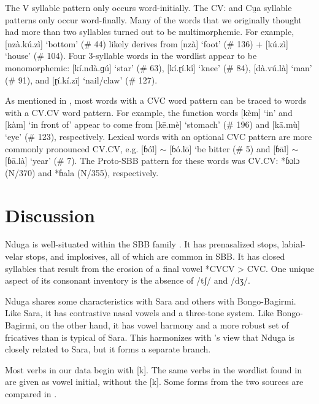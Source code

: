 \documentclass[output=paper,colorlinks,citecolor=brown
]{langscibook}
\begin{document}
The V syllable pattern only occurs word-initially. The CVː and Cu̯a syllable patterns only occur word-finally. Many of the words that we originally thought had more than two syllables turned out to be multimorphemic. For example, [nzà.kú.zì] ‘bottom’ (\# 44) likely derives from [nzà] ‘foot’ (\# 136) + [kú.zì] ‘house’ (\# 104). Four 3-syllable words in the wordlist appear to be monomorphemic: [kí.ndà.ɡú] ‘star’ (\# 63), [kí.ɽí.kî] ‘knee’ (\# 84), [dà.vú.là] ‘man’ (\# 91), and [ɽí.kí.zī] ‘nail/claw’ (\# 127).

As mentioned in , most  words with a CVC word pattern can be traced to words with a CV.CV word pattern. For example, the function words [kèm] ‘in’ and [kàm] ‘in front of’ appear to come from [kē.mè] ‘stomach’ (\# 196) and [kā.mù] ‘eye’ (\# 123), respectively. Lexical words with an optional CVC pattern are more commonly pronounced CV.CV, e.g. [ɓól̄] \(\sim \) [ɓó.lō] ‘be bitter (\# 5) and [ɓāl] \(\sim \) [ɓā.là] ‘year’ (\# 7). The Proto-SBB pattern for these words was CV.CV: *ɓɔlɔ (N/370) and *ɓala (N/355), respectively.

\section{Discussion}
\label{sec:olson:discussion}

Nduga is well-situated within the SBB family \citetext{\citealp{boyeldieu2006}; \citealp{dimmendaal2019}}. It has prenasalized stops, labial-velar stops, and implosives, all of which are common in SBB. It has closed syllables that result from the erosion of a final vowel *CVCV > CVC. One unique aspect of its consonant inventory is the absence of /tʃ/ and /dʒ/.

Nduga shares some characteristics with Sara and others with Bongo-Bagirmi. Like Sara, it has contrastive nasal vowels and a three-tone system. Like Bongo-Bagirmi, on the other hand, it has vowel harmony and a more robust set of fricatives than is typical of Sara. This harmonizes with \citet[4]{boyeldieu2006}'s view that Nduga is closely related to Sara, but it forms a separate branch.

Most verbs in our data begin with [k]. The same verbs in the wordlist found in \citet{boyeldieuetal2006} are given as vowel initial, without the [k]. Some forms from the two sources are compared in .
\end{document}
